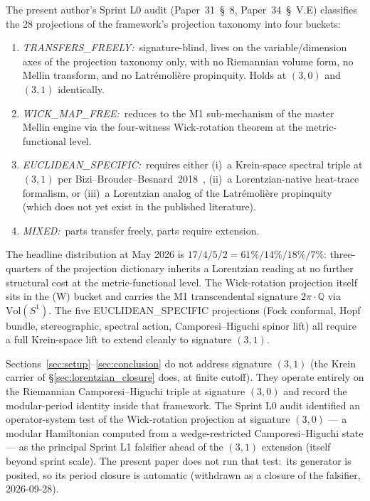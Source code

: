 \documentclass[11pt,a4paper]{article}
\theoremstyle{plain}
\theoremstyle{definition}
\newcommand{\Q}{\mathbb{Q}}
\newcommand{\Vol}{\mathrm{Vol}}
\begin{document}
The present author's Sprint L0 audit
(Paper~31~\S~8, Paper~34~\S~V.E) classifies the 28 projections of the framework's
projection taxonomy into four buckets:
\begin{enumerate}\setlength{\itemsep}{2pt}
\item[(T)] \emph{TRANSFERS\_FREELY:}\ signature-blind, lives on the
variable/dimension axes of the projection taxonomy only, with no
Riemannian volume form, no Mellin transform, and no Latr\'emoli\`ere
propinquity. Holds at $(3, 0)$ and $(3, 1)$ identically.
\item[(W)] \emph{WICK\_MAP\_FREE:}\ reduces to the M1 sub-mechanism
of the master Mellin engine via the four-witness Wick-rotation theorem
at the metric-functional level.
\item[(E)] \emph{EUCLIDEAN\_SPECIFIC:}\ requires either (i)~a
Krein-space spectral triple at $(3, 1)$ per
Bizi--Brouder--Besnard~2018~\cite{bizi_brouder_besnard2018}, (ii)~a
Lorentzian-native heat-trace formalism, or (iii)~a Lorentzian
analog of the Latr\'emoli\`ere propinquity (which does not yet exist
in the published literature).
\item[(M)] \emph{MIXED:}\ parts transfer freely, parts require
extension.
\end{enumerate}

The headline distribution at May 2026 is
$17 / 4 / 5 / 2 = 61\% / 14\% / 18\% / 7\%$: three-quarters of the
projection dictionary inherits a Lorentzian reading at no further
structural cost at the metric-functional level. The Wick-rotation
projection itself sits in the (W) bucket and carries the M1
transcendental signature $2\pi \cdot \Q$ via $\Vol(S^1)$. The
five EUCLIDEAN\_SPECIFIC projections (Fock conformal, Hopf bundle,
stereographic, spectral action, Camporesi--Higuchi spinor lift) all
require a full Krein-space lift to extend cleanly to signature
$(3, 1)$.

Sections~\ref{sec:setup}--\ref{sec:conclusion} do not address signature
$(3, 1)$ (the Krein carrier of \S\ref{sec:lorentzian_closure} does, at
finite cutoff). They operate
entirely on the Riemannian Camporesi--Higuchi triple at signature
$(3, 0)$ and record the modular-period identity inside that framework.
The Sprint L0 audit identified an operator-system test of the
Wick-rotation projection at signature $(3, 0)$ --- a modular
Hamiltonian computed from a wedge-restricted Camporesi--Higuchi state
--- as the principal Sprint L1 falsifier ahead of the $(3, 1)$
extension (itself beyond sprint scale).  The present paper does not
run that test:\ its generator is posited, so its period closure is
automatic (withdrawn as a closure of the falsifier, 2026-09-28).
\end{document}
